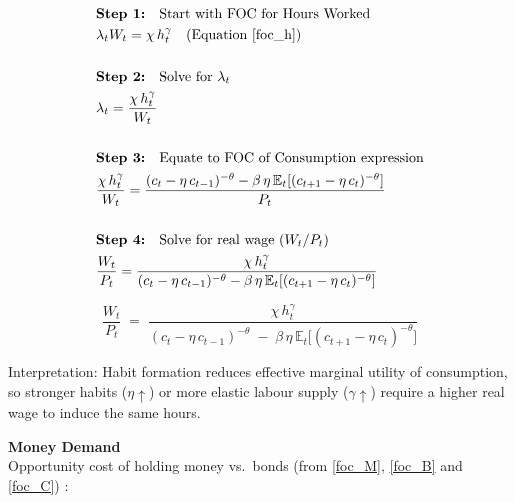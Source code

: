 \documentclass[11pt,preprint]{elsarticle}
\numberwithin{equation}{section}
\numberwithin{figure}{section}
\numberwithin{table}{section}
\begin{document}
\begin{align*}
& \textbf{Step 1:} \quad \text{Start with FOC for Hours Worked} \\
& \lambda_t W_t = \chi\,h_t^{\gamma} \quad \text{(Equation \ref{foc_h})} \\
& \\
& \textbf{Step 2:} \quad \text{Solve for } \lambda_t \\
& \lambda_t = \frac{\chi\,h_t^{\gamma}}{W_t} \\
& \\
& \textbf{Step 3:} \quad \text{Equate to FOC of Consumption expression} \\
& \frac{\chi\,h_t^{\gamma}}{W_t} = \frac{(c_t - \eta\,c_{t-1})^{-\theta} - \beta\,\eta\,\mathbb{E}_t[(c_{t+1} - \eta\,c_t)^{-\theta}]}{P_t} \\
& \\
& \textbf{Step 4:} \quad \text{Solve for real wage } (W_t/P_t) \\
& \frac{W_t}{P_t} = \frac{\chi\,h_t^{\gamma}}{(c_t - \eta\,c_{t-1})^{-\theta} - \beta\,\eta\,\mathbb{E}_t[(c_{t+1} - \eta\,c_t)^{-\theta}]}
\end{align*}

\begin{equation}\label{labourSupply_app}
\boxed{
  \frac{W_t}{P_t}
  \;=\;
  \frac{\chi\,h_t^{\gamma}}
       {(c_t - \eta\,c_{t-1})^{-\theta}
        \;-\;
        \beta\,\eta\,\mathbb{E}_t\!\bigl[(c_{t+1} - \eta\,c_t)^{-\theta}\bigr]}
}
\end{equation}

Interpretation: Habit formation reduces effective marginal utility of
consumption, so stronger habits (\(\eta\uparrow\)) or more elastic
labour supply (\(\gamma\uparrow\)) require a higher real wage to induce
the same hours.

\textbf{Money Demand}\\
Opportunity cost of holding money vs.~bonds (from \eqref{foc_M},
\eqref{foc_B} and \eqref{foc_C}) :
\end{document}
